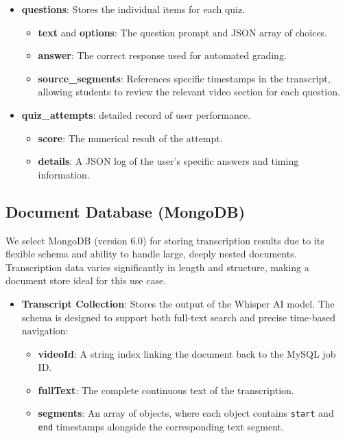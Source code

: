 \begin{itemize}
    \item \textbf{questions}: Stores the individual items for each quiz.
    \begin{itemize}
        \item \textbf{text} and \textbf{options}: The question prompt and JSON array of choices.
        \item \textbf{answer}: The correct response used for automated grading.
        \item \textbf{source\_segments}: References specific timestamps in the transcript, allowing students to review the relevant video section for each question.
    \end{itemize}

    \item \textbf{quiz\_attempts}: detailed record of user performance.
    \begin{itemize}
        \item \textbf{score}: The numerical result of the attempt.
        \item \textbf{details}: A JSON log of the user's specific answers and timing information.
    \end{itemize}
\end{itemize}

\subsection{Document Database (MongoDB)}

We select MongoDB (version 6.0) for storing transcription results due to its flexible schema and ability to handle large, deeply nested documents. Transcription data varies significantly in length and structure, making a document store ideal for this use case.

\begin{itemize}
    \item \textbf{Transcript Collection}: Stores the output of the Whisper AI model. The schema is designed to support both full-text search and precise time-based navigation:
    \begin{itemize}
        \item \textbf{videoId}: A string index linking the document back to the MySQL job ID.
        \item \textbf{fullText}: The complete continuous text of the transcription.
        \item \textbf{segments}: An array of objects, where each object contains \texttt{start} and \texttt{end} timestamps alongside the corresponding text segment.
    \end{itemize}
\end{itemize}

